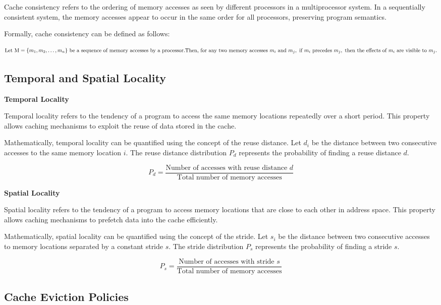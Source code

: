 \documentclass[12pt]{book} %
\begin{document}
Cache consistency refers to the ordering of memory accesses as seen by different processors in a multiprocessor system. In a sequentially consistent system, the memory accesses appear to occur in the same order for all processors, preserving program semantics.

Formally, cache consistency can be defined as follows:

\[
\text{Let } \text{M} = \{m_1, m_2, \ldots, m_n\} \text{ be a sequence of memory accesses by a processor.} \\
\text{Then, for any two memory accesses } m_i \text{ and } m_j, \text{ if } m_i \text{ precedes } m_j, \text{ then the effects of } m_i \text{ are visible to } m_j.
\]

\subsection{Temporal and Spatial Locality}

\textbf{Temporal Locality}

Temporal locality refers to the tendency of a program to access the same memory locations repeatedly over a short period. This property allows caching mechanisms to exploit the reuse of data stored in the cache.

Mathematically, temporal locality can be quantified using the concept of the reuse distance. Let \(d_i\) be the distance between two consecutive accesses to the same memory location \(i\). The reuse distance distribution \(P_d\) represents the probability of finding a reuse distance \(d\).

\[
P_d = \frac{\text{Number of accesses with reuse distance } d}{\text{Total number of memory accesses}}
\]

\textbf{Spatial Locality}

Spatial locality refers to the tendency of a program to access memory locations that are close to each other in address space. This property allows caching mechanisms to prefetch data into the cache efficiently.

Mathematically, spatial locality can be quantified using the concept of the stride. Let \(s_i\) be the distance between two consecutive accesses to memory locations separated by a constant stride \(s\). The stride distribution \(P_s\) represents the probability of finding a stride \(s\).

\[
P_s = \frac{\text{Number of accesses with stride } s}{\text{Total number of memory accesses}}
\]

\subsection{Cache Eviction Policies}
\end{document}
